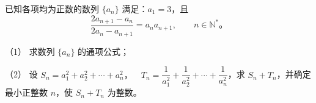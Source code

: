 \begin{question}
已知各项均为正数的数列 $\{a_n\}$ 满足：$a_1=3$，且
\nopagebreak[4]
\[
\frac{2a_{n+1}-a_n}{2a_n-a_{n+1}}=a_na_{n+1},\qquad n\in\mathbb N^*。
\]

（1） 求数列 $\{a_n\}$ 的通项公式；

（2） 设 $S_n=a_1^2+a_2^2+\cdots+a_n^2\text{，}\quad T_n=\dfrac1{a_1^2}+\dfrac1{a_2^2}+\cdots+\dfrac1{a_n^2}$，求 $S_n+T_n$，并确定最小正整数 $n$，使 $S_n+T_n$ 为整数。

\end{question}